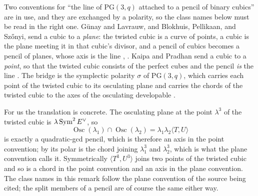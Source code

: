 \begin{remark}
\label{rem:r5-line-literature}
Two conventions for ``the line of $\mathrm{PG}(3,q)$ attached to a pencil
of binary cubics'' are in use, and they are exchanged by a polarity, so
the class names below must be read in the right one.  G\"unay and
Lavrauw, and Blokhuis, Pellikaan, and Sz\H onyi, send a cubic to a
\emph{plane}: the twisted cubic is a curve of points, a cubic is the
plane meeting it in that cubic's divisor, and a pencil of cubics becomes
a pencil of planes, whose axis is the line
\cite[\S2]{GunayLavrauw2022}, \cite[Prop.~6.5]{BPS2022}.  Kaipa and
Pradhan send a cubic to a \emph{point}, so that the twisted cubic
consists of the perfect cubes and the pencil \emph{is} the line
\cite[\S1]{KaipaPradhan2025}.  The bridge is the symplectic polarity
$\sigma$ of $\mathrm{PG}(3,q)$, which carries each point of the twisted
cubic to its osculating plane and carries the chords of the twisted
cubic to the axes of the osculating developable
\cite[\S2]{GunayLavrauw2022}.

For us the translation is concrete.  The osculating plane at the point
$\lambda^3$ of the twisted cubic is $\lambda\operatorname{Sym}^2E^\vee$, so
\[
 \operatorname{Osc}(\lambda_1)\cap\operatorname{Osc}(\lambda_2)
       =\lambda_1\lambda_2\langle T,U\rangle
\]
is exactly a quadratic-gcd pencil, which is therefore an axis in the
point convention; by \cite[Lem.~2]{GunayLavrauw2022} its polar is the
chord joining $\lambda_1^3$ and $\lambda_2^3$, which is what the plane
convention calls it.  Symmetrically $\langle T^3,U^3\rangle$ joins two
points of the twisted cubic and so is a chord in the point convention
and an axis in the plane convention.  The class names in this remark
follow the plane convention of the source being cited; the split members
of a pencil are of course the same either way.


\end{remark}
